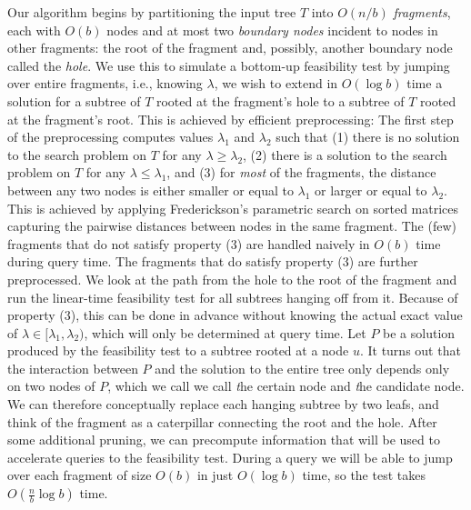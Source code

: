 \documentclass[a4paper,UKenglish]{lipics-v2016}
\theoremstyle{plain}
\begin{document}
Our algorithm begins by partitioning the input tree $T$ into $O(n/b)$ {\em fragments}, each with $O(b)$ nodes and at most two {\em boundary nodes} incident to nodes in other fragments: the root of the fragment and, possibly, another boundary node called the {\em hole}.
We use this to simulate a bottom-up feasibility test by jumping over entire 
fragments, i.e., knowing $\lambda$, we wish to extend in $O(\log b)$ time a solution for a subtree of $T$ rooted at the fragment's hole to a subtree of $T$ rooted at the fragment's root. This is achieved by efficient preprocessing: 
% 
The first step of the preprocessing computes values $\lambda_1$ and  $\lambda_2$ such that (1) there is no solution to the search problem on $T$ for any $\lambda \geq \lambda_2$, (2) there is a solution to the search problem on $T$ for any $\lambda \le \lambda_1$, and (3) for {\em most} of the fragments, the distance between any two nodes is either smaller or equal to $\lambda_1$ or larger or equal to $\lambda_2$. This is achieved by applying Frederickson's parametric search on sorted matrices capturing the pairwise distances between nodes in the same fragment. The (few) fragments that do not satisfy property (3) are handled naively in $O(b)$ time during query time. 
The fragments that do satisfy property (3) are further preprocessed. We look at the path from the hole to the root of the
fragment and run the linear-time feasibility test for all subtrees hanging off from it. Because of property (3), this can be done in advance without knowing the actual exact value of $\lambda \in [\lambda_1,\lambda_2)$, which will only be determined at query time. 
Let $P$ be a solution produced by the feasibility test to a subtree rooted at a node $u$. It turns out that the interaction between $P$ and the solution to the entire tree only depends only on two nodes of $P$, which we call we call {\emph the certain} node and {\emph the candidate} node. We can therefore conceptually replace each hanging subtree by two leafs, and think of the fragment as a caterpillar connecting the root and the hole. 
After some additional pruning, we can precompute information 
that will be used to accelerate queries to the feasibility test. During a query we will be able to jump over each fragment of size $O(b)$ in just $O(\log b)$ time, so the test takes $O(\frac{n}{b}\log b)$ time.
\end{document}
